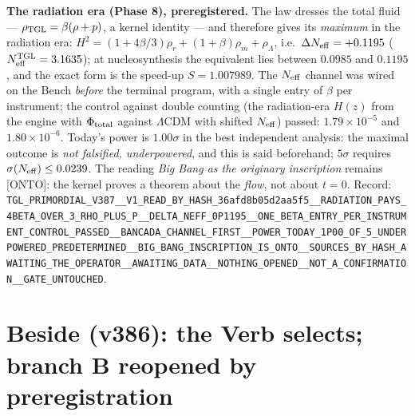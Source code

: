 \documentclass[11pt]{article}
\theoremstyle{definition}\newtheorem{deriv}{Derivation}
\begin{document}
\textbf{The radiation era (Phase 8), preregistered.} The law dresses the total fluid --- $\rho_{\rm TGL}=\beta(\rho+p)$, a kernel identity --- and therefore gives its \emph{maximum} in the radiation era: $H^2=(1+4\beta/3)\rho_r+(1+\beta)\rho_m+\rho_\Lambda$, i.e.\ $\Delta N_{\rm eff}=+0.1195$ ($N_{\rm eff}^{\rm TGL}=3.1635$); at nucleosynthesis the equivalent lies between $0.0985$ and $0.1195$, and the exact form is the speed-up $S=1.007989$. The $N_{\rm eff}$ channel was wired on the Bench \emph{before} the terminal program, with a single entry of $\beta$ per instrument; the control against double counting (the radiation-era $H(z)$ from the engine with $\Phi_{\rm total}$ against $\Lambda$CDM with shifted $N_{\rm eff}$) passed: $1.79\times10^{-5}$ and $1.80\times10^{-6}$. Today's power is $1.00\sigma$ in the best independent analysis: the maximal outcome is \emph{not falsified, underpowered}, and this is said beforehand; $5\sigma$ requires $\sigma(N_{\rm eff})\le0.0239$. The reading \emph{Big Bang as the originary inscription} remains \textsf{[ONTO]}: the kernel proves a theorem about the \emph{flow}, not about $t=0$. Record: \texttt{TGL\_\allowbreak{}PRIMORDIAL\_\allowbreak{}V387\_\allowbreak{}\_\allowbreak{}V1\_\allowbreak{}READ\_\allowbreak{}BY\_\allowbreak{}HASH\_\allowbreak{}36afd8b05d2aa5f5\_\allowbreak{}\_\allowbreak{}RADIATION\_\allowbreak{}PAYS\_\allowbreak{}4BETA\_\allowbreak{}OVER\_\allowbreak{}3\_\allowbreak{}RHO\_\allowbreak{}PLUS\_\allowbreak{}P\_\allowbreak{}\_\allowbreak{}DELTA\_\allowbreak{}NEFF\_\allowbreak{}0P1195\_\allowbreak{}\_\allowbreak{}ONE\_\allowbreak{}BETA\_\allowbreak{}ENTRY\_\allowbreak{}PER\_\allowbreak{}INSTRUMENT\_\allowbreak{}CONTROL\_\allowbreak{}PASSED\_\allowbreak{}\_\allowbreak{}BANCADA\_\allowbreak{}CHANNEL\_\allowbreak{}FIRST\_\allowbreak{}\_\allowbreak{}POWER\_\allowbreak{}TODAY\_\allowbreak{}1P00\_\allowbreak{}OF\_\allowbreak{}5\_\allowbreak{}UNDERPOWERED\_\allowbreak{}PREDETERMINED\_\allowbreak{}\_\allowbreak{}BIG\_\allowbreak{}BANG\_\allowbreak{}INSCRIPTION\_\allowbreak{}IS\_\allowbreak{}ONTO\_\allowbreak{}\_\allowbreak{}SOURCES\_\allowbreak{}BY\_\allowbreak{}HASH\_\allowbreak{}AWAITING\_\allowbreak{}THE\_\allowbreak{}OPERATOR\_\allowbreak{}\_\allowbreak{}AWAITING\_\allowbreak{}DATA\_\allowbreak{}\_\allowbreak{}NOTHING\_\allowbreak{}OPENED\_\allowbreak{}\_\allowbreak{}NOT\_\allowbreak{}A\_\allowbreak{}CONFIRMATION\_\allowbreak{}\_\allowbreak{}GATE\_\allowbreak{}UNTOUCHED}.

\section*{Beside (v386): the Verb selects; branch B reopened by preregistration}
\end{document}
